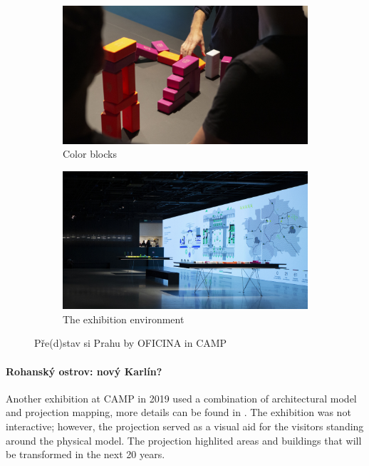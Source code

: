 \begin{figure}[h]
    \centering
    \begin{subfigure}[t]{0.49\linewidth}
        \centering
        \includegraphics[width=\linewidth]{figures/oficina1.jpg}
        \caption{Color blocks \cite{oficinaPredstav}}
        \label{fig:oficinablocks}
    \end{subfigure}
    \begin{subfigure}[t]{0.49\linewidth}
        \centering
        \includegraphics[width=\linewidth]{figures/oficina2.jpg}
        \caption{The exhibition environment \cite{oficinaPredstav}}
        \label{fig:oficinaexhib}
    \end{subfigure}
    \caption{Pře(d)stav si Prahu by OFICINA in CAMP}
    \label{fig:oficinapredstav}
\end{figure}


\paragraph{Rohanský ostrov: nový Karlín?} 
Another exhibition at CAMP in 2019 used a combination of architectural model and projection mapping, more details can be found in \cite{iprRohan}. The exhibition was not interactive; however, the projection served as a visual aid for the visitors standing around the physical model. The projection highlited areas and buildings that will be transformed in the next 20 years.

